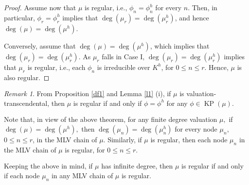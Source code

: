 \documentclass[11pt]{amsart}
\theoremstyle{definition}
\theoremstyle{remark}
\newtheorem{remark}[theorem]{Remark}
\numberwithin{equation}{section}
\begin{document}
\begin{proof}
		 Assume now that $\mu$ is regular, i.e., $\phi_n=\phi_n^h$ for every $n.$ Then, in particular, $\phi_r=\phi_r^h$ implies that $\deg(\mu_r)=\deg(\mu_r^h)$, and hence $\deg(\mu)=\deg(\mu^h).$
		 
		  Conversely, assume that $\deg(\mu)=\deg(\mu^h)$, which implies that $\deg(\mu_r)=\deg(\mu_r^h).$ As $\mu_r$ falls in Case I, $\deg(\mu_r)=\deg(\mu_r^h)$ implies that $\mu_r$ is regular, i.e., each $\phi_n$ is irreducible over $K^h$, for $0\leq n\leq r.$ Hence, $\mu$ is also regular.
		 \end{proof}
	
	\begin{remark}
		From Proposition \ref{df1} and Lemma \ref{l1} (i), if $\mu$ is valuation-transcendental, then $\mu$ is regular if and only if $\phi=\phi^h$ for any $\phi\in \operatorname{KP}(\mu).$
	\end{remark}
	
	Note that, in view of the above theorem, for any finite degree valuation $\mu,$ if $\deg(\mu)=\deg(\mu^h),$ then $\deg(\mu_n)=\deg(\mu_n^h)$ for every node $\mu_n$, $0\leq n\leq r$, in the MLV chain of $\mu$. Similarly, if $\mu$ is regular, then each node $\mu_n$ in the MLV chain of $\mu$ is regular, for $0\leq n\leq r.$ 
	
	 Keeping the above in mind, if $\mu$ has infinite degree, then $\mu$ is regular if and only if each node $\mu_n$ in any MLV chain of $\mu$ is regular.
	
\end{document}
